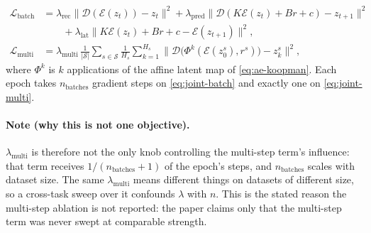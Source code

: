 \begin{align}
  \mathcal{L}_{\mathrm{batch}}
    &= \lambda_{\mathrm{rec}} \bigl\lVert \mathcal{D}(\mathcal{E}(z_t)) - z_t \bigr\rVert^2
     + \lambda_{\mathrm{pred}} \bigl\lVert \mathcal{D}(K\mathcal{E}(z_t)+Br+c) - z_{t+1} \bigr\rVert^2
     \nonumber\\
    &\qquad + \lambda_{\mathrm{lat}} \bigl\lVert K\mathcal{E}(z_t)+Br+c - \mathcal{E}(z_{t+1}) \bigr\rVert^2,
  \label{eq:joint-batch}\\[4pt]
  \mathcal{L}_{\mathrm{multi}}
    &= \lambda_{\mathrm{multi}}\,
       \frac{1}{|\mathcal{S}|}\sum_{s \in \mathcal{S}} \frac{1}{H_s}\sum_{k=1}^{H_s}
       \bigl\lVert \mathcal{D}\bigl(\Phi^k(\mathcal{E}(z_0^{s}), r^{s})\bigr) - z_k^{s} \bigr\rVert^2,
  \label{eq:joint-multi}
\end{align}
%
\noindent where $\Phi^k$ is $k$ applications of the affine latent map of
\eqref{eq:ae-koopman}. Each epoch takes $n_{\mathrm{batches}}$ gradient steps on
\eqref{eq:joint-batch} and exactly one on \eqref{eq:joint-multi}.

\paragraph{Note (why this is not one objective).}
$\lambda_{\mathrm{multi}}$ is therefore not the only knob controlling the multi-step term's
influence: that term receives $1/(n_{\mathrm{batches}}+1)$ of the epoch's steps, and
$n_{\mathrm{batches}}$ scales with dataset size. The same $\lambda_{\mathrm{multi}}$ means
different things on datasets of different size, so a cross-task sweep over it confounds
$\lambda$ with $n$. This is the stated reason the multi-step ablation is not reported: the
paper claims only that the multi-step term was never swept at comparable strength.

